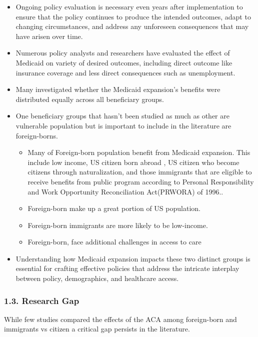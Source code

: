 \documentclass[
]{article}
\providecommand{\tightlist}{%
  \setlength{\itemsep}{0pt}\setlength{\parskip}{0pt}}
\begin{document}
\begin{itemize}
\tightlist
\item
  Ongoing policy evaluation is necessary even years after implementation
  to ensure that the policy continues to produce the intended outcomes,
  adapt to changing circumstances, and address any unforeseen
  consequences that may have arisen over time.
\item
  Numerous policy analysts and researchers have evaluated the effect of
  Medicaid on variety of desired outcomes, including direct outcome like
  insurance coverage and less direct consequences such as unemployment.
\item
  Many investigated whether the Medicaid expansion's benefits were
  distributed equally across all beneficiary groups.
\item
  One beneficiary groups that hasn't been studied as much as other are
  vulnerable population but is important to include in the literature
  are foreign-borns.

  \begin{itemize}
  \item
    Many of Foreign-born population benefit from Medicaid expansion.
    This include low income, US citizen born abroad , US citizen who
    become citizens through naturalization, and those immigrants that
    are eligible to receive benefits from public program according to
    Personal Responsibility and Work Opportunity Reconciliation
    Act(PRWORA) of 1996..
  \item
    Foreign-born make up a great portion of US population.
  \item
    Foreign-born immigrants are more likely to be low-income.
  \item
    Foreign-born, face additional challenges in access to care
  \end{itemize}
\item
  Understanding how Medicaid expansion impacts these two distinct groups
  is essential for crafting effective policies that address the
  intricate interplay between policy, demographics, and healthcare
  access.
\end{itemize}

\hypertarget{research-gap}{%
\subsubsection{1.3. Research Gap}\label{research-gap}}

While few studies compared the effects of the ACA among foreign-born and
immigrants vs citizen a critical gap persists in the literature.
\end{document}
